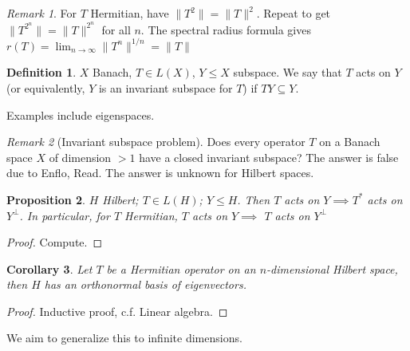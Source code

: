 \documentclass{article}
\theoremstyle{definition}
\newtheorem{defn}{Definition}[section]
\theoremstyle{remark}
\newtheorem{rem}{Remark}
\theoremstyle{plain}
\newtheorem{prop}[defn]{Proposition}
\newtheorem{crly}[defn]{Corollary}
\begin{document}
\begin{rem}
    For $T$ Hermitian, have $\|T^2\|=\|T\|^2$. Repeat to get $\|T^{2^n}\|=\|T\|^{2^n}$ for all $n$. The spectral radius formula gives $r(T)=\lim_{n\to\infty}\|T^n\|^{1/n}=\|T\|$
\end{rem}
\begin{defn}
    $X$ Banach, $T\in L(X)$, $Y\le X$ subspace. We say that $T$ acts on $Y$ (or equivalently, $Y$ is an invariant subspace for $T$) if $TY\subseteq Y$.
\end{defn}
Examples include eigenspaces.
\begin{rem}[Invariant subspace problem]
    Does every operator $T$ on a Banach space $X$ of dimension $>1$ have a closed invariant subspace? The answer is false due to Enflo, Read. The answer is unknown for Hilbert spaces.
\end{rem}
\begin{prop}
    $H$ Hilbert; $T\in L(H)$; $Y\le H$. Then $T$ acts on $Y\implies T^\ast$ acts on $Y^\perp$.
    In particular, for $T$ Hermitian, $T$ acts on $Y\implies$ $T$ acts on $Y^\perp$
\end{prop}
\begin{proof}
    Compute.
\end{proof}
\begin{crly}
    Let $T$ be a Hermitian operator on an $n$-dimensional Hilbert space, then $H$ has an orthonormal basis of eigenvectors.
\end{crly}
\begin{proof}
    Inductive proof, c.f. Linear algebra.
\end{proof}
We aim to generalize this to infinite dimensions.
\end{document}
